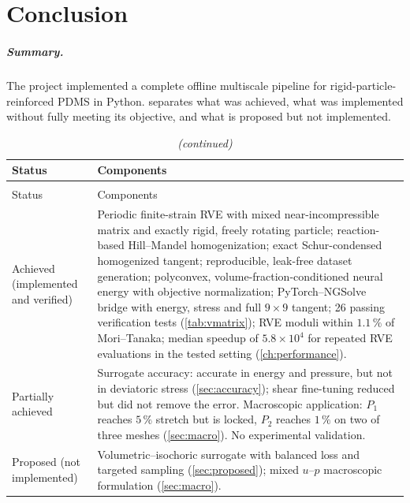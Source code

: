 \chapter{Conclusion}\label{ch:conclusion}

\paragraph{Summary.} The project implemented a complete offline multiscale
pipeline for rigid-particle-reinforced PDMS in Python.  separates
what was achieved, what was implemented without fully meeting its objective, and
what is proposed but not implemented.

{\small
\begin{xltabular}{\textwidth}{@{}p{2.6cm}X@{}}
\caption{Status of the project components.}\label{tab:status}\\
\toprule
Status & Components\\
\midrule
\endfirsthead
\caption[]{\emph{(continued)}}\\
\toprule
Status & Components\\
\midrule
\endhead
\bottomrule
\endfoot
Achieved (implemented and verified) &
  Periodic finite-strain RVE with mixed near-incompressible matrix and exactly
  rigid, freely rotating particle; reaction-based Hill--Mandel homogenization;
  exact Schur-condensed homogenized tangent; reproducible, leak-free dataset
  generation; polyconvex, volume-fraction-conditioned neural energy with objective
  normalization; PyTorch--NGSolve bridge with energy, stress and full $9\times9$
  tangent; 26 passing verification tests (\cref{tab:vmatrix}); RVE moduli within
  $1.1\,\%$ of Mori--Tanaka; median speedup of $5.8\times10^4$ for repeated RVE
  evaluations in the tested setting (\cref{ch:performance}).\\
Partially achieved &
  Surrogate accuracy: accurate in energy and pressure, but not in deviatoric stress
  (\cref{sec:accuracy}); shear fine-tuning reduced but did not remove the error.
  Macroscopic application: $P_1$ reaches $5\,\%$ stretch but is locked, $P_2$ reaches
  $1\,\%$ on two of three meshes (\cref{sec:macro}). No experimental validation.\\
Proposed (not implemented) &
  Volumetric--isochoric surrogate with balanced loss and targeted sampling
  (\cref{sec:proposed}); mixed $u$--$p$ macroscopic formulation (\cref{sec:macro}).\\
\end{xltabular}
}

